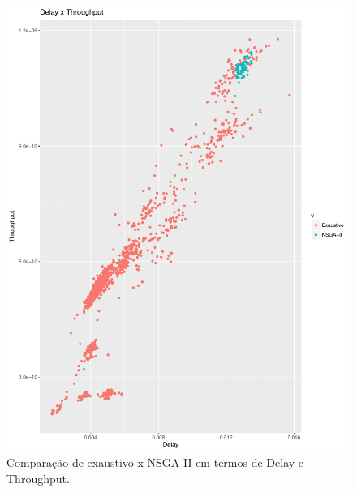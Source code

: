 \documentclass[conference]{IEEEtran}
\begin{document}
\begin{figure}[h]
  \centering
  \includegraphics[scale=0.30]{figures/ExaustivoXNsgaii_DelayXThroughput.pdf}
  \caption{Comparação de exaustivo x NSGA-II em termos de Delay e Throughput.}
  \label{fig:exaustivo-nsgaii-1}
\end{figure}
\end{document}
